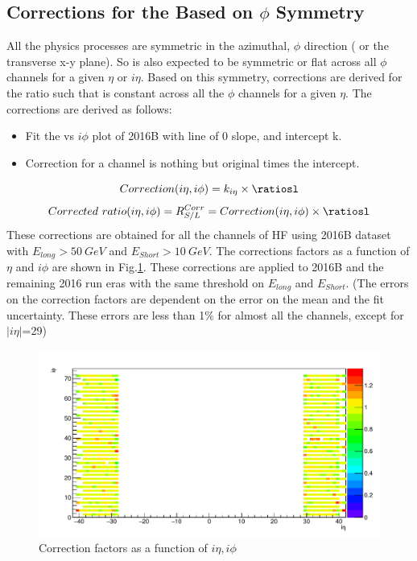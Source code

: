 \subsection{Corrections for the \ratiosl Based on $\phi$ Symmetry}
All the physics processes are symmetric in the azimuthal, $\phi$ direction ( or the transverse x-y plane). 
So \ratiosl is also expected to be symmetric or flat across all $\phi$ channels for a given $\eta$ or $i\eta$.
Based on this symmetry, corrections are derived for the ratio such that \ratiosl is constant across all the $\phi$ channels for a given $\eta$. The corrections are derived as follows:
\begin{itemize}
\item Fit the \ratiosl vs $i\phi$ plot of 2016B with line of 0 slope, and intercept k.
\item Correction for a channel is nothing but original \ratiosl times the intercept.
\end{itemize}
\begin{equation}
Correction(i\eta,i\phi) = k_{i\eta} \times \ratiosl \\
\end{equation}
\begin{equation}
Corrected\ ratio(i\eta,i\phi) = R_{S/L}^{Corr} = Correction(i\eta,i\phi) \times \ratiosl
\end{equation}
These corrections are obtained for all the channels of HF using 2016B dataset with $E_{long} > 50~GeV$ and $E_{Short} > 10~GeV$. The corrections factors as a function of $\eta$ and $i\phi$ are shown in Fig.\ref{fig:corrFacEL50ES10}. 
These corrections are applied to 2016B and the remaining 2016 run eras with the same threshold on $E_{long}$ and $E_{Short}$.
 (The errors on the correction factors are dependent on the error on the mean \ratiosl and the fit uncertainty. These errors are less than 1\% for almost all the channels, except for $|i\eta|$=29)
\begin{figure}[h]
\centering
\includegraphics[width=0.7\linewidth]{../Figures/Chap2/ImageFiles_HF/Ratio/2016/corrFacEL50ES10.pdf}
\caption{Correction factors as a function of $i\eta, i\phi$}
\label{fig:corrFacEL50ES10}
\end{figure}

